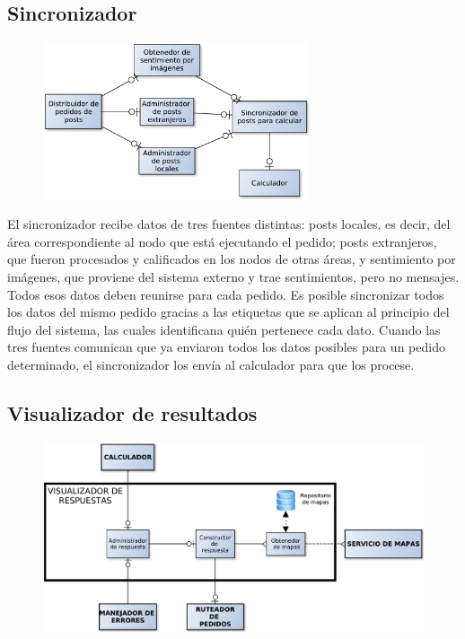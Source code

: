 \subsection{Sincronizador}

\begin{figure}[H]
\centering
\includegraphics[width=0.7\textwidth]{graph/sincro.pdf}
\end{figure}

El sincronizador recibe datos de tres fuentes distintas: posts locales, es decir, del área correspondiente al nodo que está ejecutando el pedido; posts extranjeros, que fueron procesados y calificados en los nodos de otras áreas, y sentimiento por imágenes, que proviene del sistema externo y trae sentimientos, pero no mensajes. Todos esos datos deben reunirse para cada pedido. Es posible sincronizar todos los datos del mismo pedido gracias a las etiquetas que se aplican al principio del flujo del sistema, las cuales identificana quién pertenece cada dato. Cuando las tres fuentes comunican que ya enviaron todos los datos posibles para un pedido determinado, el sincronizador los envía al calculador para que los procese.

\subsection{Visualizador de resultados}

\begin{figure}[H]
\centering
\includegraphics[width=\textwidth]{graph/visualizador.pdf}
\end{figure}

